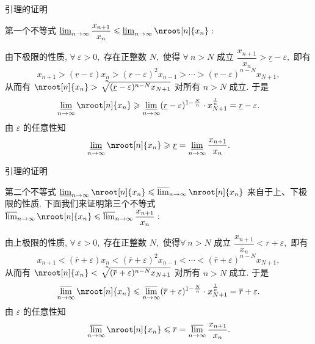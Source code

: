 
\begin{frame}{引理的证明}

第一个不等式 $\varliminf_{n\to\infty} \dfrac{x_{n+1}}{x_n} \leqslant \varliminf_{n\to\infty} \nroot[n]{x_n}:$

\pause
\vspace{1em}

由下极限的性质, $\forall~\varepsilon > 0,$ 存在正整数 $N,$ 使得 $\forall~n > N$ 成立 $\dfrac{x_{n+1}}{x_n} > \underline{r} - \varepsilon,$ 即有
\vspace*{-0.5em}
\[x_{n+1} > (\underline{r} - \varepsilon) x_n > (\underline{r} - \varepsilon)^2 x_{n-1} > \cdots > (\underline{r} - \varepsilon)^{n-N} x_{N+1},\]
从而有 $\nroot[n]{x_n} > \sqrt[\leftroot{-6}\uproot{9}n]{(\underline{r} - \varepsilon)^{n-N} x_{N+1}}$ 对所有 $n > N$ 成立. 于是
\[\varliminf_{n\to\infty} \nroot[n]{x_n} \geqslant \varliminf_{n\to\infty} (\underline{r} - \varepsilon)^{1-\frac{N}{n}} \cdot x_{N+1}^{\frac{1}{n}} = \underline{r} - \varepsilon.\]
由 $\varepsilon$ 的任意性知
\[\varliminf_{n\to\infty} \nroot[n]{x_n} \geqslant \underline{r} = \varliminf_{n\to\infty} \dfrac{x_{n+1}}{x_n}.\]

\end{frame}


\begin{frame}{引理的证明}

第二个不等式 $\varliminf_{n\to\infty} \nroot[n]{x_n} \leqslant \varlimsup_{n\to\infty} \nroot[n]{x_n}$ 来自于上、下极限的性质. 下面我们来证明第三个不等式 $\varlimsup_{n\to\infty} \nroot[n]{x_n} \leqslant \varlimsup_{n\to\infty} \dfrac{x_{n+1}}{x_n}:$

\pause
\vspace{1em}

由上极限的性质, $\forall~\varepsilon > 0,$ 存在正整数 $N,$ 使得$\forall~n > N$ 成立 $\dfrac{x_{n+1}}{x_n} < \overline{r} + \varepsilon,$ 即有
\vspace*{-0.5em}
\[x_{n+1} < (\overline{r} + \varepsilon) x_n < (\overline{r} + \varepsilon)^2 x_{n-1} < \cdots < (\overline{r} + \varepsilon)^{n-N} x_{N+1},\]
从而有 $\nroot[n]{x_n} < \sqrt[\leftroot{-6}\uproot{9}n]{(\overline{r} + \varepsilon)^{n-N} x_{N+1}}$ 对所有 $n > N$ 成立. 于是
\[\varlimsup_{n\to\infty} \nroot[n]{x_n} \leqslant \varlimsup_{n\to\infty} (\overline{r} + \varepsilon)^{1-\frac{N}{n}} \cdot x_{N+1}^{\frac{1}{n}} = \overline{r} + \varepsilon.\]
由 $\varepsilon$ 的任意性知
\[\varlimsup_{n\to\infty} \nroot[n]{x_n} \leqslant \overline{r} = \varlimsup_{n\to\infty} \dfrac{x_{n+1}}{x_n}.\]

\end{frame}

